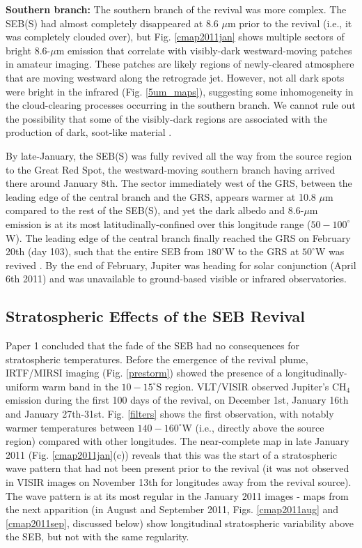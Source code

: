 \documentclass[final,authoryear,5p,times,twocolumn]{elsarticle}
\begin{document}
\textbf{Southern branch: } The southern branch of the revival was more complex.  The SEB(S) had almost completely disappeared at 8.6 $\mu$m prior to the revival (i.e., it was completely clouded over), but Fig. \ref{cmap2011jan} shows multiple sectors of bright 8.6-$\mu$m emission that correlate with visibly-dark westward-moving patches in amateur imaging.  These patches are likely regions of newly-cleared atmosphere that are moving westward along the retrograde jet.  However, not all dark spots were bright in the infrared (Fig. \ref{5um_maps}), suggesting some inhomogeneity in the cloud-clearing processes occurring in the southern branch.  We cannot rule out the possibility that some of the visibly-dark regions are associated with the production of dark, soot-like material \citep{09baines_storms}.  

By late-January, the SEB(S) was fully revived all the way from the source region to the Great Red Spot, the westward-moving southern branch having arrived there around January 8th.  The sector immediately west of the GRS, between the leading edge of the central branch and the GRS, appears warmer at 10.8 $\mu$m compared to the rest of the SEB(S), and yet the dark albedo and 8.6-$\mu$m emission is at its most latitudinally-confined over this longitude range ($50-100^\circ$W).  The leading edge of the central branch finally reached the GRS on February 20th (day 103), such that the entire SEB from $180^\circ$W to the GRS at $50^\circ$W was revived \citep{11rogers_24, 16rogers}.  By the end of February, Jupiter was heading for solar conjunction (April 6th 2011) and was unavailable to ground-based visible or infrared observatories. 

\subsection{Stratospheric Effects of the SEB Revival}
\label{stratwave}
Paper 1 concluded that the fade of the SEB had no consequences for stratospheric temperatures.  Before the emergence of the revival plume, IRTF/MIRSI imaging (Fig. \ref{prestorm}) showed the presence of a longitudinally-uniform warm band in the $10-15^\circ$S region.  VLT/VISIR observed Jupiter's CH$_4$ emission during the first 100 days of the revival, on December 1st, January 16th and January 27th-31st.  Fig. \ref{filters} shows the first observation, with notably warmer temperatures between $140-160^\circ$W (i.e., directly above the source region) compared with other longitudes.  The near-complete map in late January 2011 (Fig. \ref{cmap2011jan}(c)) reveals that this was the start of a stratospheric wave pattern that had not been present prior to the revival (it was not observed in VISIR images on November 13th for longitudes away from the revival source).   The wave pattern is at its most regular in the January 2011 images - maps from the next apparition (in August and September 2011, Figs. \ref{cmap2011aug} and \ref{cmap2011sep}, discussed below) show longitudinal stratospheric variability above the SEB, but not with the same regularity.
\end{document}
